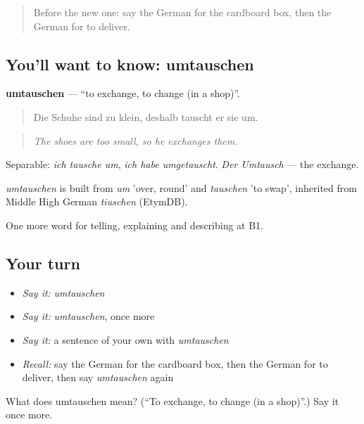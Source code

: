 \label{lesson:GE-C452-umtauschen}



\begin{quote}
Before the new one: say the German for the cardboard box, then the German for to deliver.
\end{quote}

\subsection*{You'll want to know: umtauschen}
\textbf{umtauschen} — \textquotedblleft{}to exchange, to change (in a shop)\textquotedblright{}.

\begin{quote}
Die Schuhe sind zu klein, deshalb tauscht er sie um.
\end{quote}

\begin{quote}
\emph{The shoes are too small, so he exchanges them.}
\end{quote}

Separable: \emph{ich tausche um}, \emph{ich habe umgetauscht}. \emph{Der Umtausch} — the exchange.

\begin{cousinweb}
\emph{umtauschen} is built from \emph{um} 'over, round' and \emph{tauschen} 'to swap', inherited from Middle High German \emph{tiuschen} (EtymDB).
\end{cousinweb}

\begin{grammarlens}[title={What you've built}]
One more word for telling, explaining and describing at B1.
\end{grammarlens}

\subsection*{Your turn}
\begin{itemize}
\raggedright
  \item \emph{Say it:} \emph{umtauschen}
  \item \emph{Say it:} \emph{umtauschen}, once more
  \item \emph{Say it:} a sentence of your own with \emph{umtauschen}
  \item \emph{Recall:} say the German for the cardboard box, then the German for to deliver, then say \emph{umtauschen} again
\end{itemize}

\begin{tcolorbox}[breakable,colback=teal!4,colframe=teal!35!black,title={Before you move on}]
What does umtauschen mean? (\textquotedblleft{}To exchange, to change (in a shop)\textquotedblright{}.) Say it once more.
\end{tcolorbox}

